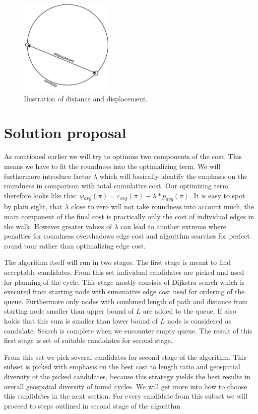 \documentclass{ctuthesis}
\begin{document}
\begin{figure}
\includegraphics[width=0.4\textwidth]{displacement}
\caption{Ilustration of distance and displacement.}
\end{figure}

\chapter{Solution proposal}
As mentioned earlier we will try to optimize two components of the cost. This means we have to fit the roundness into the optimalizing term. We will furthermore introduce factor \(\lambda\) which will basically identify the emphasis on the roundness in comparison with total cumulative cost. Our optimizing term therefore looks like this: \(w_{avg}(\pi) = c_{avg}(\pi) + \lambda * p_{avg}(\pi)\). It is easy to spot by plain sight, that \(\lambda\) close to zero will not take roundness into account much, the main component of the final cost is practically only the cost of individual edges in the walk. However greater values of \(\lambda\) can lead to another extreme where penalties for roundness overshadows edge cost and algorithm searches for perfect round tour rather than optimalizing edge cost. \par
The algorithm itself will run in two stages. The first stage is meant to find acceptable candidates. From this set individual candidates are picked and used for planning of the cycle. This stage mostly consists of Dijkstra search which is executed from starting node with summative edge cost used for ordering of the queue. Furthermore only nodes with combined length of path and distance from starting node smaller than upper bound of \(L\) are added to the queue. If also holds that this sum is smaller than lower bound of \(L\) node is considered as candidate. Search is complete when we encounter empty queue. The result of this first stage is set of suitable candidates for second stage.\par
From this set we pick several candidates for second stage of the algorithm. This subset is picked with emphasis on  the best cost to length ratio and geospatial diversity of the picked candidates, because this strategy yields the best results in overall geospatial diversity of found cycles. We will get more into how to choose this candidates in the next section. For every candidate from this subset we will proceed to steps outlined in second stage of the algorithm \par
\end{document}

